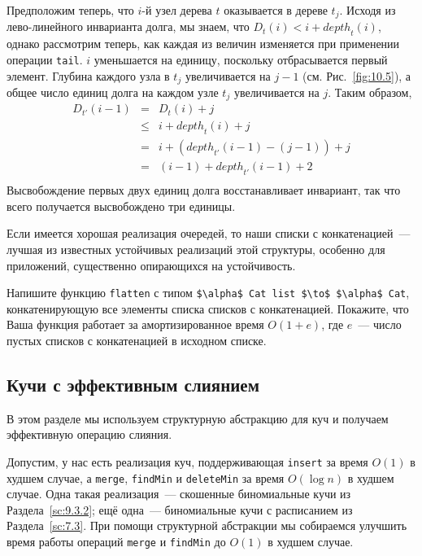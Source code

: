 \begin{theorem}
  Предположим теперь, что $i$-й узел дерева $t$ оказывается в дереве
  $t_j$. Исходя из лево-линейного инварианта долга, мы знаем, что
  $D_t(i) < i + \mathit{depth}_t(i)$, однако рассмотрим теперь, как
  каждая из величин изменяется при применении операции
  \lstinline!tail!. $i$ уменьшается на единицу, поскольку
  отбрасывается первый элемент. Глубина каждого узла в $t_j$
  увеличивается на $j-1$ (см. Рис.~\ref{fig:10.5}), а общее число
  единиц долга на каждом узле $t_j$ увеличивается на $j$. Таким
  образом,
  $$
  \begin{array}{lcl}
    D_{t'}(i-1) & = & D_t(i) + j \\
                & \le & i + \mathit{depth}_t(i) + j \\
                & = & i + (\mathit{depth}_{t'}(i-1) - (j-1)) + j \\
                & = & (i-1) + \mathit{depth}_{t'}(i-1) + 2 \\
  \end{array}
  $$
  Высвобождение первых двух единиц долга восстанавливает инвариант,
  так что всего получается высвобождено три единицы.
\end{theorem}

\begin{hint}
  Если имеется хорошая реализация очередей, то наши списки с
  конкатенацией~--- лучшая из известных устойчивых реализаций этой структуры, особенно
  для приложений, существенно опирающихся на устойчивость.
\end{hint}

\begin{exercise}\label{ex:10.6}
  Напишите функцию \lstinline!flatten! с типом
  \lstinline!$\alpha$ Cat list $\to$ $\alpha$ Cat!, конкатенирующую
  все элементы списка списков с конкатенацией. Покажите, что Ваша
  функция работает за амортизированное время $O(1+e)$, где $e$~---
  число пустых списков с конкатенацией в исходном списке.
\end{exercise}

\subsection{Кучи с эффективным слиянием}
\label{sc:10.2.2}

В этом разделе мы используем структурную абстракцию для куч и получаем
эффективную операцию слияния.

Допустим, у нас есть реализация куч, поддерживающая \lstinline!insert!
за время $O(1)$ в худшем случае, а \lstinline!merge!,
\lstinline!findMin! и \lstinline!deleteMin! за время $O(\log n)$ в
худшем случае. Одна такая реализация~--- скошенные биномиальные кучи
из Раздела~\ref{sc:9.3.2}; ещё одна~--- биномиальные кучи с
расписанием из Раздела~\ref{sc:7.3}. При помощи структурной абстракции
мы собираемся улучшить время работы операций \lstinline!merge! и
\lstinline!findMin! до $O(1)$ в худшем случае.


